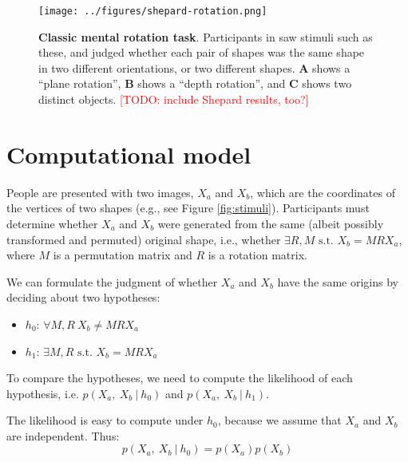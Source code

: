 \documentclass{article} %
\newcommand{\TODO}[1]{\textcolor{red}{[TODO: #1]}}
\begin{document}

\begin{figure}[t]
  \centering
  \texttt{[image: ../figures/shepard-rotation.png]}
  \caption{\textbf{Classic mental rotation task}. Participants in
    \cite{Shepard1971} saw stimuli such as these, and judged whether
    each pair of shapes was the same shape in two different
    orientations, or two different shapes. \textbf{A} shows a ``plane
    rotation'', \textbf{B} shows a ``depth rotation'', and \textbf{C}
    shows two distinct objects. \TODO{include Shepard results, too?}}
  \label{fig:mental-rotation}
\end{figure}

\section{Computational model}

People are presented with two images, $X_a$ and $X_b$, which are the
coordinates of the vertices of two shapes (e.g., see Figure
\ref{fig:stimuli}). Participants must determine whether $X_a$ and
$X_b$ were generated from the same (albeit possibly transformed and
permuted) original shape, i.e., whether $\exists R,M\textrm{ s.t. }
X_b=MRX_a$, where $M$ is a permutation matrix and $R$ is a rotation
matrix.

We can formulate the judgment of whether $X_a$ and $X_b$ have the same
origins by deciding about two hypotheses:

\begin{itemize}
\itemsep1pt\parskip0pt
\item
  $h_0$: $\forall M,R\ X_b\neq MRX_a$
\item
  $h_1$: $\exists M,R\textrm{ s.t. } X_b=MRX_a$
\end{itemize}

To compare the hypotheses, we need to compute the likelihood of each
hypothesis, i.e. $p(X_a,\ X_b\ \vert \ h_0)$ and $p(X_a,\ X_b\ \vert \
h_1)$.

The likelihood is easy to compute under $h_0$, because we assume that
$X_a$ and $X_b$ are independent. Thus:
\begin{equation}
  p(X_a,\ X_b\ \vert \ h_0)=p(X_a)p(X_b)
  \label{eq:lh-h0}
\end{equation}
\end{document}
